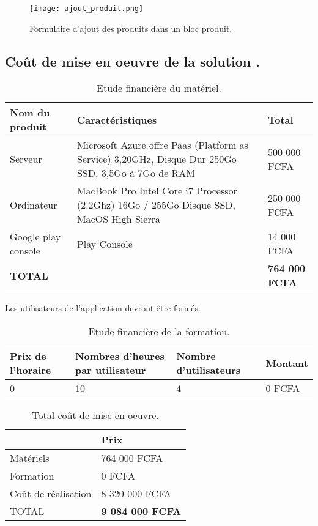\begin{figure}[H]
	\centering
	\texttt{[image: ajout\_produit.png]}
	\caption{Formulaire d'ajout des produits dans un bloc produit.}
	\label{fig:sp0}
\end{figure}

\subsection{Coût de mise en oeuvre de la solution .}

\begin{table}[H]
	\caption{Etude financière du matériel.}
	\label{Etude financière du matériel.}
	\centering
	\begin{tabularx}{\linewidth}{|X|X|X|}
		\hline \rowcolor{lightgray}  
		\textbf{Nom du produit} & \textbf{Caractéristiques} & \textbf{Total}\\
		\hline
		Serveur & Microsoft Azure offre Paas (Platform as Service) 3,20GHz, Disque Dur 250Go SSD, 3,5Go à 7Go de RAM & 500 000 FCFA \\
		\hline
		Ordinateur & MacBook Pro Intel Core i7 
Processor (2.2Ghz) 16Go / 255Go
Disque SSD, MacOS High Sierra
 &  250 000 FCFA \\
		\hline
		Google play console & Play Console  & 14 000 FCFA\\
		\hline
		\textbf{TOTAL}  &   &  \textbf{764 000 FCFA}  \\	
		\hline
	\end{tabularx}
\end{table}

Les utilisateurs de l’application devront être formés.

\begin{table}[H]
	\caption{Etude financière de la formation.}
	\label{Etude financière de la formation.}
	\centering
	\begin{tabularx}{\linewidth}{|X|X|X|X|}
		\hline \rowcolor{lightgray}  
		 \textbf{Prix de l'horaire} & \textbf{Nombres d'heures par utilisateur} & \textbf{Nombre d'utilisateurs} & \textbf{Montant} \\
		\hline
		 0 & 10 & 4 & 0 FCFA\\
		\hline
	\end{tabularx}
\end{table}

\begin{table}[H]
	\caption{Total coût de mise en oeuvre.}
	\label{Total coût de mise en oeuvre.}
	\centering
	\begin{tabularx}{\linewidth}{X|X|}
		\hline \rowcolor{lightgray}  
		 \textbf{ } & \textbf{Prix}\\
		\hline
		 Matériels & 764 000 FCFA \\
		\hline
		 Formation
 &  0 FCFA \\
		\hline
		 Coût de réalisation  & 8 320 000 FCFA\\
		\hline
		 TOTAL   &  \textbf{9 084 000 FCFA}  \\	
		\hline
	\end{tabularx}
\end{table}

